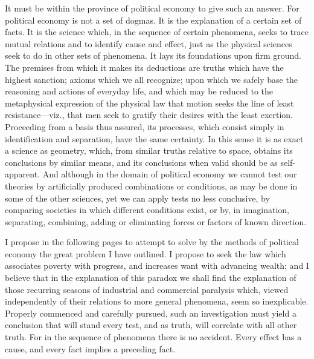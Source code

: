 It must be within the province of political economy to give such an
answer. For political economy is not a set of dogmas. It is the
explanation of a certain set of facts. It is the science which, in the
sequence of certain phenomena, seeks to trace mutual relations and to
identify cause and effect, just as the physical sciences seek to do in
other sets of phenomena. It lays its foundations upon firm ground. The
premises from which it makes its deductions are truths which have the
highest sanction; axioms which we all recognize; upon which we safely
base the reasoning and actions of everyday life, and which may be
reduced to the metaphysical expression of the physical law that motion
seeks the line of least resistance---viz., that men seek to gratify
their desires with the least exertion. Proceeding from a basis thus
assured, its processes, which consist simply in identification and
separation, have the same certainty. In this sense it is as exact a
science as geometry, which, from similar truths relative to space,
obtains its conclusions by similar means, and its conclusions when valid
should be as self-apparent. And although in the domain of political
economy we cannot test our theories by artificially produced
combinations or conditions, as may be done in some of the other
sciences, yet we can apply tests no less conclusive, by comparing
societies in which different conditions exist, or by, in imagination,
separating, combining, adding or eliminating forces or factors of known
direction.

I propose in the following pages to attempt to solve by the methods of
political economy the great problem I have outlined. I propose to seek
the law which associates poverty with progress, and increases want with
advancing wealth; and I believe that in the explanation of this paradox
we shall find the explanation of those recurring seasons of industrial
and commercial paralysis which, viewed independently of their relations
to more general phenomena, seem so inexplicable. Properly commenced and
carefully pursued, such an investigation must yield a conclusion that
will stand every test, and as truth, will correlate with all other
truth. For in the sequence of phenomena there is no accident. Every
effect has a cause, and every fact implies a preceding fact.

